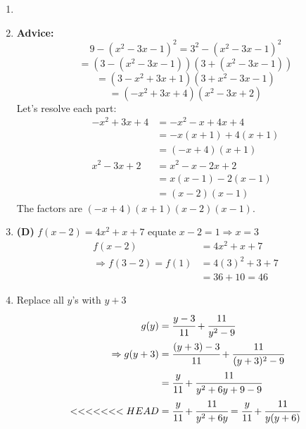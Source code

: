 \begin{multicols}{2}
\begin{enumerate}[label={\textbf{\arabic*.}}]
    \item
    \item \textbf{Advice:} 
    \[ 9 - (x^2 - 3x - 1)^2 = 3^2 - (x^2 - 3x - 1)^2\]  
    \[ = (3 - (x^2 - 3x - 1))(3 + (x^2 - 3x - 1))\]
    \[ = (3 - x^2 + 3x + 1)(3 + x^2 - 3x - 1) \]
    \[= (-x^2 + 3x + 4)(x^2 - 3x + 2)\]
    Let's resolve each part:
    \begin{align*}
    -x^2 + 3x + 4 &= -x^2 - x + 4x + 4 \\
    &= -x(x + 1) + 4(x + 1) \\
    &= (-x + 4)(x + 1)\\
    x^2 - 3x + 2 &= x^2 - x - 2x + 2 \\
    &= x(x - 1) - 2(x - 1) \\
    &= (x - 2)(x - 1)
    \end{align*}
    The factors are \((-x + 4)(x + 1)(x - 2)(x - 1)\).

    \item \textbf{(D)} $f(x - 2) = 4x^2 + x + 7 $ equate $x - 2 = 1 \Rightarrow x = 3$ 
    \begin{align*} 
        f(x - 2) &= 4x^2 + x + 7 \\
        \Rightarrow  f(3 - 2) = f(1) &= 4(3)^2 + 3 + 7 \\
        & = 36 + 10 = 46
    \end{align*}

    \item Replace all \(y\)'s with \(y + 3\)
    \begin{align*} 
        g(y) &= \cfrac{y - 3}{11} + \cfrac{11}{y^2 - 9} \\
       \Rightarrow  g(y + 3) &= \cfrac{(y + 3) - 3}{11} + \cfrac{11}{(y + 3)^2 - 9}  \\
        & = \cfrac{y}{11} + \cfrac{11}{y^2 + 6y + 9 -9} \\
<<<<<<< HEAD
        & = \cfrac{y}{11} + \cfrac{11}{y^2 + 6y} = \cfrac{y}{11} + \cfrac{11}{y (y + 6 )}
    \end{align*}


\end{enumerate}
\end{multicols}
